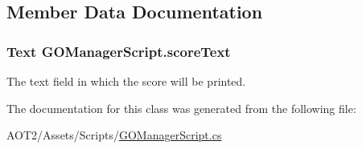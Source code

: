 \subsection{Member Data Documentation}
\hypertarget{class_g_o_manager_script_ae6df0f7858c9b610f96af2e6bc84dcad}{
\subsubsection[{score\-Text}]{\setlength{\rightskip}{0pt plus 5cm}Text G\-O\-Manager\-Script.\-score\-Text}}\label{class_g_o_manager_script_ae6df0f7858c9b610f96af2e6bc84dcad}
The text field in which the score will be printed. 

The documentation for this class was generated from the following file\-:\begin{DoxyCompactItemize}
\item 
A\-O\-T2/\-Assets/\-Scripts/\hyperlink{_g_o_manager_script_8cs}{G\-O\-Manager\-Script.\-cs}\end{DoxyCompactItemize}

